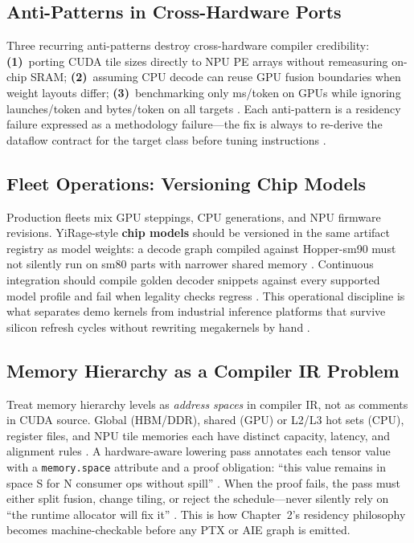 \subsection{Anti-Patterns in Cross-Hardware Ports}
\label{sec:ch03_anti_patterns}

Three recurring anti-patterns destroy cross-hardware compiler credibility:
\textbf{(1)}~porting CUDA tile sizes directly to NPU PE arrays without remeasuring on-chip SRAM;
\textbf{(2)}~assuming CPU decode can reuse GPU fusion boundaries when weight layouts differ;
\textbf{(3)}~benchmarking only ms/token on GPUs while ignoring launches/token and bytes/token on all targets \citep{taxbreak2026,memoryfloor2026,patel2025llminference}.
Each anti-pattern is a residency failure expressed as a methodology failure---the fix is always to re-derive the dataflow contract for the target class before tuning instructions \citep{dlbook,amd2024xdna}.

\subsection{Fleet Operations: Versioning Chip Models}
\label{sec:ch03_fleet_ops}

Production fleets mix GPU steppings, CPU generations, and NPU firmware revisions.
YiRage-style \textbf{chip models} should be versioned in the same artifact registry as model weights: a decode graph compiled against Hopper-sm90 must not silently run on sm80 parts with narrower shared memory \citep{nvidia2022hopper,memoryfloor2026}.
Continuous integration should compile golden decoder snippets against every supported model profile and fail when legality checks regress \citep{patel2025llminference}.
This operational discipline is what separates demo kernels from industrial inference platforms that survive silicon refresh cycles without rewriting megakernels by hand \citep{taxbreak2026,amd2024xdna}.

\subsection{Memory Hierarchy as a Compiler IR Problem}
\label{sec:ch03_memory_ir}

Treat memory hierarchy levels as \emph{address spaces} in compiler IR, not as comments in CUDA source.
Global (HBM/DDR), shared (GPU) or L2/L3 hot sets (CPU), register files, and NPU tile memories each have distinct capacity, latency, and alignment rules \citep{dlbook,nvidia2022hopper,amd2024aie}.
A hardware-aware lowering pass annotates each tensor value with a \texttt{memory.space} attribute and a proof obligation: ``this value remains in space S for N consumer ops without spill'' \citep{patel2025llminference}.
When the proof fails, the pass must either split fusion, change tiling, or reject the schedule---never silently rely on ``the runtime allocator will fix it'' \citep{memoryfloor2026}.
This is how Chapter~2's residency philosophy becomes machine-checkable before any PTX or AIE graph is emitted.

